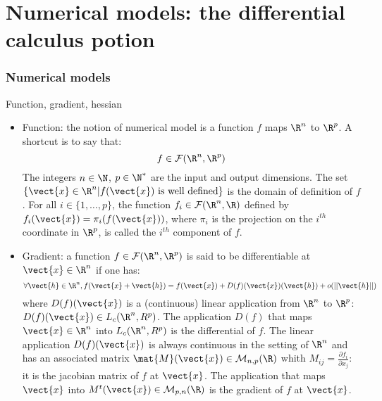 \documentclass[8pt]{beamer}
\begin{document}
\section[Numerical models: the differential calculus potion]{Numerical models: the differential calculus potion}
\begin{frame}
  \frametitle{Numerical models}
  \begin{block}{Function, gradient, hessian}
    \begin{itemize}
    \item \alert{Function:} the notion of \alert{numerical model} is a function $f$ maps $\R^n$ to $\R^p$. A shortcut is to say that:
      \begin{equation}
        f\in\mathcal{F}(\R^n,\R^p)
      \end{equation}
      The integers $n\in\N$, $p\in\N^{*}$ are the \alert{input} and \alert{output} dimensions. The set $\{\vect{x}\in\R^n|f(\vect{x})\mbox{ is well defined}\}$ is the \alert{domain of definition} of $f$. For all $i\in\{1,\dots,p\}$, the function $f_i\in\mathcal{F}(\R^n,\R)$ defined by $f_i(\vect{x})=\pi_i(f(\vect{x}))$, where $\pi_i$ is the projection on the $i^{th}$ coordinate in $\R^p$, is called the \alert{$i^{th}$ component} of $f$.
    \item \alert{Gradient:} a function $f\in\mathcal{F}(\R^n,\R^p)$ is said to be \alert{differentiable} at $\vect{x}\in\R^n$ if one has:
      \begin{equation}
        \forall\vect{h}\in\R^n, f(\vect{x}+\vect{h})=f(\vect{x})+D(f)(\vect{x})(\vect{h})+o(||\vect{h}||)
      \end{equation}
      where $D(f)(\vect{x})$ is a (continuous) linear application from $\R^n$ to $\R^p$: $D(f)(\vect{x})\in L_c(\R^n,R^p)$. The application $D(f)$ that maps $\vect{x}\in\R^n$ into $L_c(\R^n,R^p)$ is the \alert{differential} of $f$. The linear application $D(f)(\vect{x})$ is always continuous in the setting of $\R^n$ and has an associated matrix $\mat{M}(\vect{x})\in\mathcal{M}_{n,p}(\R)$ whith $M_{ij}=\frac{\partial f_i}{\partial x_j}$: it is the \alert{jacobian matrix} of $f$ at $\vect{x}$. The application that maps $\vect{x}$ into $M^t(\vect{x})\in\mathcal{M}_{p,n}(\R)$ is the \alert{gradient} of $f$ at $\vect{x}$.
    \end{itemize}
  \end{block}
\end{frame}
\end{document}
